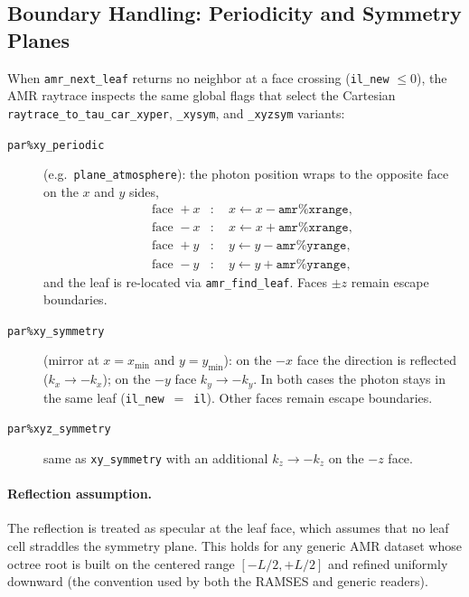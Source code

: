 \documentclass[english,a4paper]{my_memo}
\begin{document}
\subsection{Boundary Handling: Periodicity and Symmetry Planes}
\label{sec:amr-boundary}

When \texttt{amr\_next\_leaf} returns no neighbor at a face crossing
(\texttt{il\_new} $\le 0$), the AMR raytrace inspects the same global
flags that select the Cartesian \texttt{raytrace\_to\_tau\_car\_xyper},
\texttt{\_xysym}, and \texttt{\_xyzsym} variants:

\begin{description}
  \item[\texttt{par\%xy\_periodic}] (e.g.\ \texttt{plane\_atmosphere}):
        the photon position wraps to the opposite face on the $x$ and $y$
        sides,
        \begin{align*}
          \text{face } +x &: \quad x \leftarrow x - \texttt{amr\%xrange}, \\
          \text{face } -x &: \quad x \leftarrow x + \texttt{amr\%xrange}, \\
          \text{face } +y &: \quad y \leftarrow y - \texttt{amr\%yrange}, \\
          \text{face } -y &: \quad y \leftarrow y + \texttt{amr\%yrange},
        \end{align*}
        and the leaf is re-located via \texttt{amr\_find\_leaf}.  Faces
        $\pm z$ remain escape boundaries.

  \item[\texttt{par\%xy\_symmetry}] (mirror at $x=x_\mathrm{min}$ and
        $y=y_\mathrm{min}$): on the $-x$ face the direction is reflected
        ($k_x \to -k_x$); on the $-y$ face $k_y \to -k_y$.  In both
        cases the photon stays in the same leaf
        (\texttt{il\_new}~$=$~\texttt{il}).  Other faces remain escape
        boundaries.

  \item[\texttt{par\%xyz\_symmetry}] same as \texttt{xy\_symmetry} with
        an additional $k_z \to -k_z$ on the $-z$ face.
\end{description}

\paragraph{Reflection assumption.}
The reflection is treated as specular at the leaf face, which assumes
that no leaf cell straddles the symmetry plane.  This holds for any
generic AMR dataset whose octree root is built on the centered range
$[-L/2, +L/2]$ and refined uniformly downward (the convention used by
both the RAMSES and generic readers).
\end{document}
